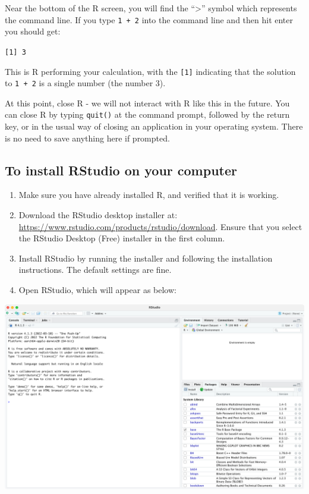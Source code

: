 \documentclass[
]{memoir}
\providecommand{\tightlist}{%
  \setlength{\itemsep}{0pt}\setlength{\parskip}{0pt}}
\begin{document}
Near the bottom of the R screen, you will find the ``\textgreater{}'' symbol which represents the command line. If you type \texttt{1\ +\ 2} into the command line and then hit enter you should get:

\texttt{{[}1{]}\ 3}

This is R performing your calculation, with the \texttt{{[}1{]}} indicating that the solution to \texttt{1\ +\ 2} is a single number (the number 3).

At this point, close R - we will not interact with R like this in the future. You can close R by typing \texttt{quit()} at the command prompt, followed by the return key, or in the usual way of closing an application in your operating system. There is no need to save anything here if prompted.

\hypertarget{to-install-rstudio-on-your-computer}{%
\subsection{To install RStudio on your computer}\label{to-install-rstudio-on-your-computer}}

\begin{enumerate}
\def\labelenumi{\arabic{enumi}.}
\tightlist
\item
  Make sure you have already installed R, and verified that it is working.
\item
  Download the RStudio desktop installer at: \url{https://www.rstudio.com/products/rstudio/download}. Ensure that you select the RStudio Desktop (Free) installer in the first column.
\item
  Install RStudio by running the installer and following the installation instructions. The default settings are fine.
\item
  Open RStudio, which will appear as below:
\end{enumerate}

\includegraphics[width=1\linewidth]{img/RStudio-screenshot-01}
\end{document}
